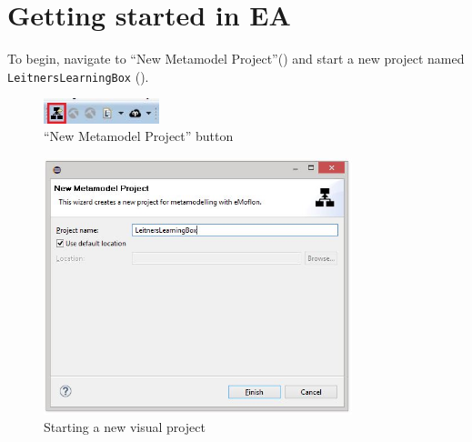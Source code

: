 \newpage
\hypertarget{static:starting vis}{}
\section{Getting started in EA}
\genHeader
  
\begin{stepbystep}

\item  To begin, navigate to ``New Metamodel Project''() and start a new project named \texttt{Leit\-ners\-Learn\-ing\-Box} (). 

\vspace{0.5cm}

\begin{figure}[htbp]
	\centering
  \includegraphics[width=0.3\textwidth]{../../org.moflon.doc.handbook.02_leitnersLearningBox/2_staticSemantics/1_newStart/nsVisImages/eclipse_visNewMetamodelButton}
	\caption{``New Metamodel Project'' button}
	\label{eclipse:newVisModelButton}
\end{figure}
\begin{figure}[htbp]
	\centering
  \includegraphics[width=0.8\textwidth]{../../org.moflon.doc.handbook.02_leitnersLearningBox/2_staticSemantics/1_newStart/nsVisImages/eclipse_visNewMetamodelPlain}
	\caption{Starting a new visual project}
	\label{eclipse:newVisModel}
\end{figure}

\vspace{0.5cm}


\end{stepbystep}
